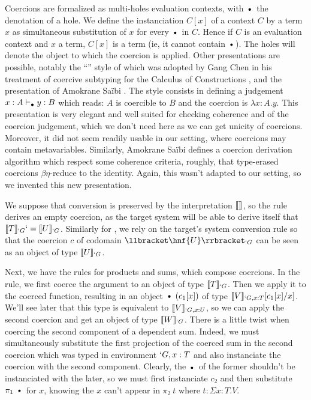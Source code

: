 \documentclass{llncs}
\begin{document}

Coercions are formalized as multi-holes evaluation contexts, with
$\ctxdot$ the denotation of a hole. We define the instanciation $C[x]$ of a context $C$
by a term $x$ as simultaneous substitution of $x$ for every $\ctxdot$ in $C$.
Hence if $C$ is an evaluation context and $x$ a term, $C[x]$ is a term
(ie, it cannot contain $\ctxdot$).
The holes will denote the object to which the coercion is applied. Other
presentations are possible, notably the ``\LMS{}'' style of \cite{longo95logic} which
was adopted by Gang Chen in his treatment of coercive subtyping for the
Calculus of Constructions \cite{conf/popl/Chen03}, and the presentation 
of Amokrane Sa\"ibi \cite{saibi97inheritance}. The \LMS{} style consists
in defining a judgement $x : A \vdash_{\bullet} y : B$ which reads: $A$ is
coercible to $B$ and the coercion is $\lambda x : A.y$. This
presentation is very elegant and well suited for checking coherence and
of the coercion judgement, which we don't need here as we can get unicity
of coercions. Moreover, it did not seem readily usable in
our setting, where coercions may contain metavariables. Similarly, Amokrane Sa\"ibi defines
a coercion derivation algorithm which respect some coherence criteria,
roughly, that type-erased coercions $\beta\eta$-reduce to the
identity. Again, this wasn't adapted to our setting, so we invented this
new presentation. 

We suppose that conversion is preserved by the interpretation $\llbracket  \rrbracket_{}$, so
the rule  derives an empty coercion, as the target system
will be able to derive itself that $\llbracket T \rrbracket_{`G} `= \llbracket U \rrbracket_{`G}$.
Similarly for , we rely on the target's system conversion
rule so that the coercion $c$ of codomain $\ip{\hnf{U}}{`G}$ can be seen
as an object of type $\llbracket U \rrbracket_{`G}$.

Next, we have the rules for products and sums, which compose
coercions. In the  rule, we first coerce the argument to
an object of type $\llbracket T \rrbracket_{`G}$. Then we apply it to the coerced
function, resulting in an object $\ctxdot~(c_1[x])$ of type
$\llbracket V \rrbracket_{`G, x : T}[c_1[x]/x]$. We'll see later that this type is equivalent to
$\llbracket V \rrbracket_{`G, x : U}$, so we can apply the second coercion and get an
object of type $\llbracket W \rrbracket_{`G}$. There is a little twist when coercing the
second component of a dependent sum. Indeed, we must simultaneously
substitute the first projection of the coerced sum in the second
coercion which was typed in environment $`G, x : T$ and also instanciate
the coercion with the second component. Clearly, the $\ctxdot$ of the
former shouldn't be instanciated with the later, so we must first
instanciate $c_2$ and then substitute $\pi_1~\ctxdot$ for $x$, knowing
the $x$ can't appear in $\pi_2~t$ where $t : \Sigma x : T.V$.
\end{document}
